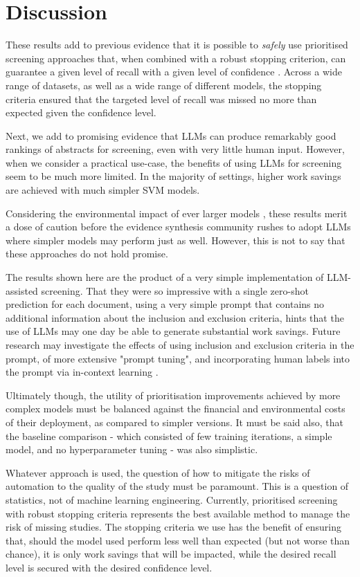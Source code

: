 \documentclass{article}
\begin{document}
	
	\section*{Discussion}
	
	These results add to previous evidence that it is possible to \textit{safely} use prioritised screening approaches that, when combined with a robust stopping criterion, can guarantee a given level of recall with a given level of confidence \cite{callaghan_statistical_2020}. Across a wide range of datasets, as well as a wide range of different models, the stopping criteria ensured that the targeted level of recall was missed no more than expected given the confidence level.
	
	Next, we add to promising evidence that LLMs can produce remarkably good rankings of abstracts for screening, even with very little human input. However, when we consider a practical use-case, the benefits of using LLMs for screening seem to be much more limited. In the majority of settings, higher work savings are achieved with much simpler SVM models.

    Considering the environmental impact of ever larger models \cite{luccioni_power_2024}, these results merit a dose of caution before the evidence synthesis community rushes to adopt LLMs where simpler models may perform just as well. However, this is not to say that these approaches do not hold promise. 
    
    The results shown here are the product of a very simple implementation of LLM-assisted screening. That they were so impressive with a single zero-shot prediction for each document, using a very simple prompt that contains no additional information about the inclusion and exclusion criteria, hints that the use of LLMs may one day be able to generate substantial work savings. Future research may investigate the effects of using inclusion and exclusion criteria in the prompt, of more extensive "prompt tuning", and incorporating human labels into the prompt via in-context learning \cite{dong_survey_2024}.

    Ultimately though, the utility of prioritisation improvements achieved by more complex models must be balanced against the financial and environmental costs of their deployment, as compared to simpler versions. It must be said also, that the baseline comparison - which consisted of few training iterations, a simple model, and no hyperparameter tuning - was also simplistic.

    Whatever approach is used, the question of how to mitigate the risks of automation to the quality of the study must be paramount. This is a question of statistics, not of machine learning engineering. Currently, prioritised screening with robust stopping criteria represents the best available method to manage the risk of missing studies. The stopping criteria we use has the benefit of ensuring that, should the model used perform less well than expected (but not worse than chance), it is only work savings that will be impacted, while the desired recall level is secured with the desired confidence level.
	
\end{document}
